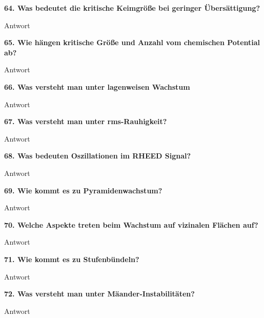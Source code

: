 \noindent\textbf{64. Was bedeutet die kritische Keimgröße bei geringer Übersättigung?}\\
\begin{addmargin}[25pt]{0pt}
Antwort\\
\end{addmargin}

\noindent\textbf{65. Wie hängen kritische Größe und Anzahl vom chemischen Potential ab?}\\
\begin{addmargin}[25pt]{0pt}
Antwort\\
\end{addmargin}

\noindent\textbf{66. Was versteht man unter lagenweisen Wachstum}\\
\begin{addmargin}[25pt]{0pt}
Antwort\\
\end{addmargin}

\noindent\textbf{67. Was versteht man unter rms-Rauhigkeit?}\\
\begin{addmargin}[25pt]{0pt}
Antwort\\
\end{addmargin}

\noindent\textbf{68. Was bedeuten Oszillationen im RHEED Signal?}\\
\begin{addmargin}[25pt]{0pt}
Antwort\\
\end{addmargin}

\noindent\textbf{69. Wie kommt es zu Pyramidenwachstum?}\\
\begin{addmargin}[25pt]{0pt}
Antwort\\
\end{addmargin}

\noindent\textbf{70. Welche Aspekte treten beim Wachstum auf vizinalen Flächen auf?}\\
\begin{addmargin}[25pt]{0pt}
Antwort\\
\end{addmargin}

\noindent\textbf{71. Wie kommt es zu Stufenbündeln?}\\
\begin{addmargin}[25pt]{0pt}
Antwort\\
\end{addmargin}

\noindent\textbf{72. Was versteht man unter Mäander-Instabilitäten?}\\
\begin{addmargin}[25pt]{0pt}
Antwort\\
\end{addmargin}

